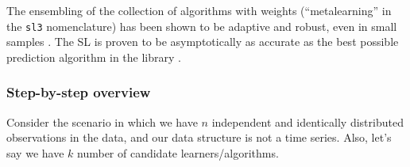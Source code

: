 \documentclass[12pt, krantz2,]{krantz}
\theoremstyle{definition}
\theoremstyle{definition}
\theoremstyle{definition}
\newcommand{\1}{\mathbbm{1}}
\begin{document}
The ensembling of the collection of algorithms with weights (``metalearning'' in
the \texttt{sl3} nomenclature) has been shown to be adaptive and robust, even in small
samples \citep{polley2010super}. The SL is proven to be asymptotically as accurate as
the best possible prediction algorithm in the library \citep{vdl2003unified, vaart2006oracle}.

\hypertarget{step-by-step-overview}{%
\subsubsection*{Step-by-step overview}\label{step-by-step-overview}}


Consider the scenario in which we have \(n\) independent and identically
distributed observations in the data, and our data structure is not a time
series. Also, let's say we have \(k\) number of candidate learners/algorithms.
\end{document}
